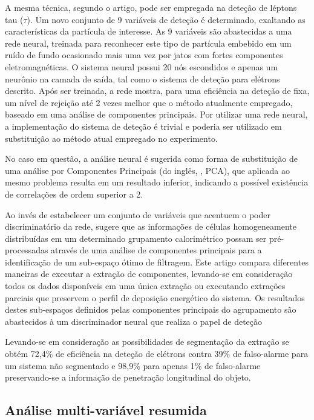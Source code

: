 A mesma técnica, segundo o artigo, pode ser empregada na deteção de léptons
tau ($\tau$). Um novo conjunto de 9 variáveis de deteção é determinado,
exaltando as características da partícula de interesse. As 9 variáveis são
abastecidas a uma rede neural, treinada para reconhecer este tipo de partícula
embebido em um ruído de fundo ocasionado mais uma vez por jatos com fortes
componentes eletromagnéticas. O sistema neural possui 20 nós escondidos e
apenas um neurônio na camada de saída, tal como o sistema de deteção para
elétrons descrito. Após ser treinada, a rede mostra, para uma eficiência na
deteção de  fixa, um nível de rejeição até 2 vezes melhor que o
método atualmente empregado, baseado em uma análise de componentes
principais. Por utilizar uma rede neural, a implementação do sistema de
deteção é trivial e poderia ser utilizado em substituição ao método atual
empregado no experimento.

No caso em questão, a análise neural é sugerida como forma de substituição de
uma análise por Componentes Principais (do inglês, , PCA), que aplicada ao mesmo problema resulta em um resultado
inferior, indicando a possível existência de correlações de ordem superior a
2. 

Ao invés de estabelecer um conjunto de variáveis que acentuem o poder
discriminatório da rede, \cite{vassali-acat-2001} sugere que as informações de
células homogeneamente distribuídas em um determinado grupamento calorimétrico
possam ser pré-processadas através de uma análise de componentes principais
para a identificação de um sub-espaço ótimo de filtragem. Este artigo compara
diferentes maneiras de executar a extração de componentes, levando-se em
consideração todos os dados disponíveis em uma única extração ou executando
extrações parciais que preservem o perfil de deposição energético do
sistema. Os resultados destes sub-espaços definidos pelas componentes
principais do agrupamento são abastecidos à um discriminador neural que
realiza o papel de deteção

Levando-se em consideração as possibilidades de segmentação da extração
se obtém 72,4\% de eficiência na deteção de elétrons contra 39\% de
falso-alarme para um sistema não segmentado e 98,9\% para apenas 1\% de
falso-alarme preservando-se a informação de penetração longitudinal do objeto.

\subsection{Análise multi-variável resumida}

